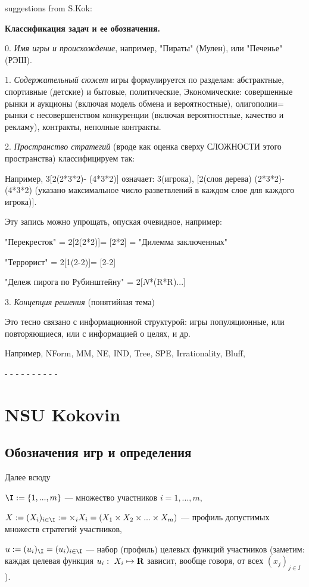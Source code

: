 \documentclass[a4paper,12pt]{article}
\def\R{{\bf R}}
\begin{document}
{\small suggestions from S.Kok:

{\bf Классификация задач и ее обозначения.}

0. {\em Имя игры и происхождение}, например, "Пираты"
(Мулен), или "Печенье" (РЭШ).

1. {\em Содержательный сюжет} игры формулируется по
разделам: абстрактные, спортивные (детские) и бытовые,
политические, Экономические: совершенные рынки и аукционы
(включая модель обмена и вероятностные), олигополии= рынки
с несовершенством конкуренции (включая вероятностные,
качество и рекламу), контракты, неполные контракты.

2. {\em Пространство стратегий} (вроде как оценка сверху
СЛОЖНОСТИ этого пространства) классифицируем так:

Например, 3[2(2*3*2)- (4*3*2)] означает: 3(игрока), [2(слоя
дерева) (2*3*2)- (4*3*2) (указано максимальное число
разветвлений в каждом слое для каждого игрока)].

Эту запись можно упрощать, опуская очевидное, например:

"Перекресток" = 2[2(2*2)]= [2*2] = "Дилемма заключенных"

"Террорист" = 2[1(2-2)]= [2-2]

"Дележ пирога по Рубинштейну" = 2[$N$*(R*R)...]

3. {\em Концепция решения} (понятийная тема)

Это тесно связано с информационной структурой: игры
популяционные, или повторяющиеся, или с информацией о
целях, и др.

Например, NForm, MM, NE, IND, Tree, SPE,
Irrationality, Bluff, }

\vspace{2mm}

- - - - - - - - - -
\newpage
\tableofcontents

\newpage

\section{NSU Kokovin}

\subsection{Обозначения игр и определения}

Далее всюду  \bedscr\item  $ \I := \{1,...,m \}$
---  множество участников $i=1,...,m$, \item  $X:=
(X_i)_{i\in \I}  := \times_{i} X_i = (X_1\times
X_2\times ...  \times  X_m)$ --- профиль допустимых
множеств стратегий участников,
 \item $u:= (u_i)_\I = (u_i)_{i\in \I }$ --- набор (профиль)
целевых функций участников (заметим: каждая целевая функция
$u_i:~X_i\mapsto \R$ зависит, вообще говоря, от всех
$(x_j)_{j\in I}$). \edscr
\end{document}

